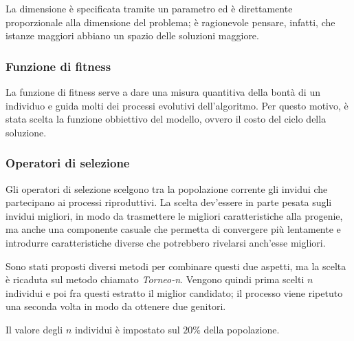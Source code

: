 La dimensione è specificata tramite un parametro ed è direttamente proporzionale alla dimensione del problema;
è ragionevole pensare, infatti, che istanze maggiori abbiano un spazio delle soluzioni maggiore.
\subsubsection{Funzione di fitness}\label{subsubsec:funzione-fitness}
La funzione di fitness serve a dare una misura quantitiva della bontà di un individuo e guida
molti dei processi evolutivi dell'algoritmo.
Per questo motivo, è stata scelta la funzione obbiettivo del modello, ovvero il costo del ciclo della soluzione.
\subsubsection{Operatori di selezione}\label{subsubsec:operatori-selezione}
Gli operatori di selezione scelgono tra la popolazione corrente gli invidui che partecipano ai processi riproduttivi.
La scelta dev'essere in parte pesata sugli invidui migliori, in modo da trasmettere le migliori caratteristiche
alla progenie, ma anche una componente casuale che permetta di convergere più lentamente e introdurre caratteristiche
diverse che potrebbero rivelarsi anch'esse migliori.

Sono stati proposti diversi metodi per combinare questi due aspetti, ma la scelta è ricaduta sul metodo
chiamato \textit{Torneo-n}.
Vengono quindi prima scelti $n$ individui e poi fra questi estratto il miglior candidato; il processo viene ripetuto
una seconda volta in modo da ottenere due genitori.

Il valore degli $n$ individui è impostato sul $20\%$ della popolazione.
